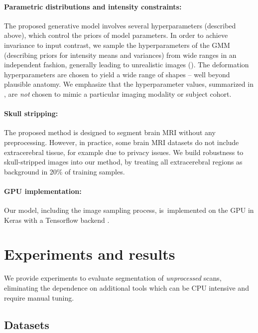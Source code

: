 \documentclass{midl}
\begin{document}
\paragraph{Parametric distributions and intensity constraints:}
The proposed generative model involves several hyperparameters (described above), which control the priors of model parameters. 
In order to achieve invariance to input contrast, we sample the hyperparameters of the GMM (describing priors for intensity means and variances)  from wide ranges in an independent fashion, generally leading to  unrealistic images (). The deformation hyperparameters are chosen to yield a wide range of shapes -- well beyond plausible anatomy. We emphasize that the hyperparameter values, summarized in , are \textit{not} chosen to mimic a particular imaging modality or subject cohort. 

\paragraph{Skull stripping:} 
The proposed method is designed to segment brain MRI without any preprocessing. However, in practice, some brain MRI datasets do not include extracerebral tissue, for example due to privacy issues. We build robustness to skull-stripped images into our method, by treating all extracerebral regions as background in 20\% of training samples. 

\paragraph{GPU implementation:}Our model, including the image sampling process, is~\mbox{implemented} on the GPU in Keras \cite{chollet_keras_2015} with a Tensorflow backend \cite{abadi_tensorflow_2016}.




\section{Experiments and results}

We provide experiments to evaluate segmentation of \textit{unprocessed} scans, eliminating the dependence on additional tools which can be CPU intensive and require manual tuning. 


\subsection{Datasets}
\end{document}
